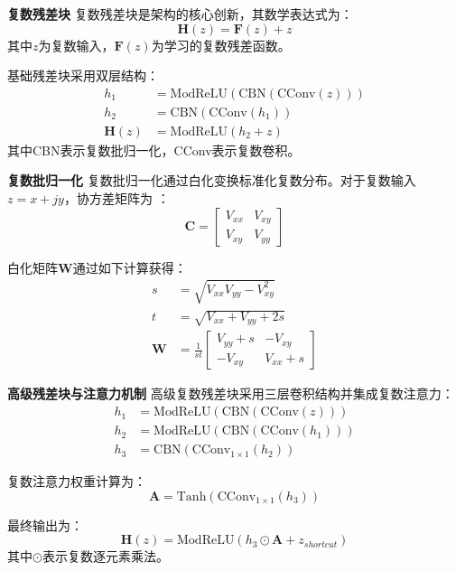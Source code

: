 \documentclass[conference]{IEEEtran}
\begin{document}
\textbf{复数残差块} 复数残差块是架构的核心创新，其数学表达式为：
\begin{equation}
\mathbf{H}(z) = \mathbf{F}(z) + z
\end{equation}
其中$z$为复数输入，$\mathbf{F}(z)$为学习的复数残差函数。

基础残差块采用双层结构：
\begin{align}
h_1 &= \text{ModReLU}(\text{CBN}(\text{CConv}(z))) \\
h_2 &= \text{CBN}(\text{CConv}(h_1)) \\
\mathbf{H}(z) &= \text{ModReLU}(h_2 + z)
\end{align}
其中CBN表示复数批归一化，CConv表示复数卷积。

\textbf{复数批归一化} 复数批归一化通过白化变换标准化复数分布。对于复数输入$z = x + jy$，协方差矩阵为 \cite{[46]}：
\begin{equation}
\mathbf{C} = \begin{bmatrix} V_{xx} & V_{xy} \\ V_{xy} & V_{yy} \end{bmatrix}
\end{equation}

白化矩阵$\mathbf{W}$通过如下计算获得：
\begin{align}
s &= \sqrt{V_{xx}V_{yy} - V_{xy}^2} \\
t &= \sqrt{V_{xx} + V_{yy} + 2s} \\
\mathbf{W} &= \frac{1}{st}\begin{bmatrix} V_{yy} + s & -V_{xy} \\ -V_{xy} & V_{xx} + s \end{bmatrix}
\end{align}

\textbf{高级残差块与注意力机制} 高级复数残差块采用三层卷积结构并集成复数注意力：
\begin{align}
h_1 &= \text{ModReLU}(\text{CBN}(\text{CConv}(z))) \\
h_2 &= \text{ModReLU}(\text{CBN}(\text{CConv}(h_1))) \\
h_3 &= \text{CBN}(\text{CConv}_{1 \times 1}(h_2))
\end{align}

复数注意力权重计算为：
\begin{equation}
\mathbf{A} = \text{Tanh}(\text{CConv}_{1 \times 1}(h_3))
\end{equation}

最终输出为：
\begin{equation}
\mathbf{H}(z) = \text{ModReLU}(h_3 \odot \mathbf{A} + z_{shortcut})
\end{equation}
其中$\odot$表示复数逐元素乘法。
\end{document}
